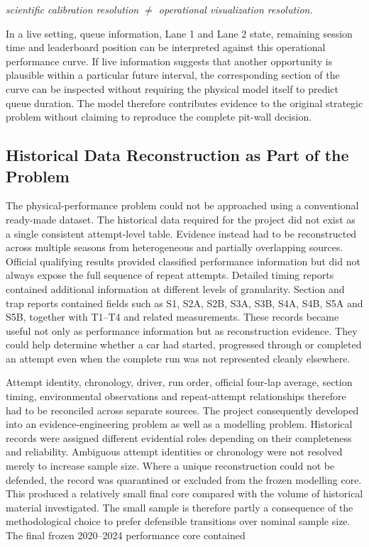 \begin{center}\textit{scientific calibration resolution \ensuremath{\neq} operational visualization resolution.}\end{center}

In a live setting, queue information, Lane 1 and Lane 2 state, remaining session time and leaderboard position can be interpreted against this operational performance curve. If live information suggests that another opportunity is plausible within a particular future interval, the corresponding section of the curve can be inspected without requiring the physical model itself to predict queue duration. The model therefore contributes evidence to the original strategic problem without claiming to reproduce the complete pit-wall decision.

\subsection{Historical Data Reconstruction as Part of the Problem}
The physical-performance problem could not be approached using a conventional ready-made dataset. The historical data required for the project did not exist as a single consistent attempt-level table. Evidence instead had to be reconstructed across multiple seasons from heterogeneous and partially overlapping sources. Official qualifying results provided classified performance information but did not always expose the full sequence of repeat attempts. Detailed timing reports contained additional information at different levels of granularity. Section and trap reports contained fields such as S1, S2A, S2B, S3A, S3B, S4A, S4B, S5A and S5B, together with T1--T4 and related measurements. These records became useful not only as performance information but as reconstruction evidence. They could help determine whether a car had started, progressed through or completed an attempt even when the complete run was not represented cleanly elsewhere.

Attempt identity, chronology, driver, run order, official four-lap average, section timing, environmental observations and repeat-attempt relationships therefore had to be reconciled across separate sources. The project consequently developed into an evidence-engineering problem as well as a modelling problem. Historical records were assigned different evidential roles depending on their completeness and reliability. Ambiguous attempt identities or chronology were not resolved merely to increase sample size. Where a unique reconstruction could not be defended, the record was quarantined or excluded from the frozen modelling core. This produced a relatively small final core compared with the volume of historical material investigated. The small sample is therefore partly a consequence of the methodological choice to prefer defensible transitions over nominal sample size. The final frozen 2020--2024 performance core contained

